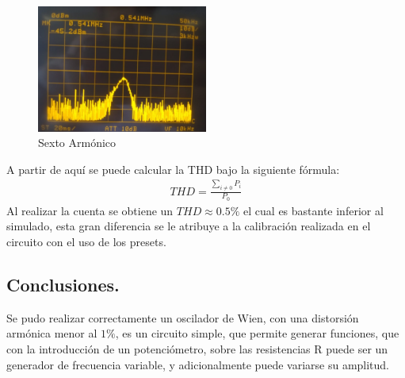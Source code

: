 \begin{figure}[H]
	\centering
	\includegraphics[width=0.5\textwidth]{Imagenes-Ej1/6Armonico.jpeg}
	\caption{Sexto Armónico}
	\label{fig:6to}
\end{figure}
 A partir de aquí se puede calcular la THD bajo la siguiente fórmula:
 \begin{align}
 THD= \frac{\sum_{i\neq 0} P_i}{P_0}
 \end{align}
Al realizar la cuenta se obtiene un $THD\approx 0.5\%$ el cual es bastante inferior al simulado, esta gran diferencia se le atribuye a la calibración realizada en el circuito con el uso de los presets.
\subsection{Conclusiones.}
Se pudo realizar correctamente un oscilador de Wien, con una distorsión armónica menor al $1\%$, es un circuito simple, que permite generar funciones, que con la introducción de un potenciómetro, sobre las resistencias R puede ser un generador de frecuencia variable, y adicionalmente puede variarse su amplitud.
